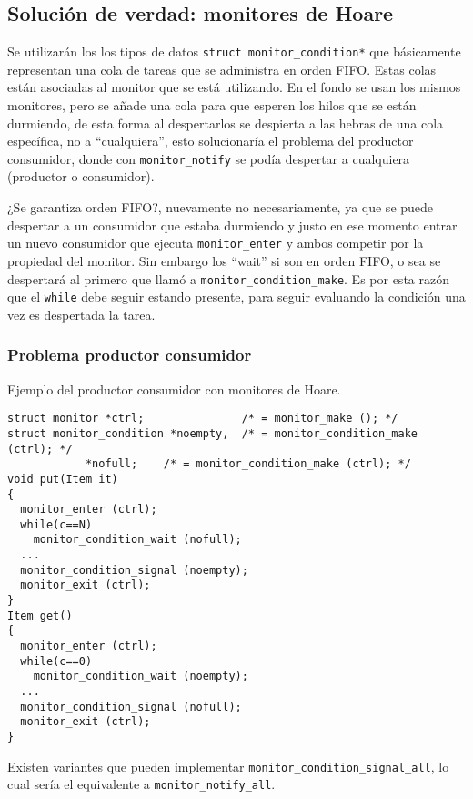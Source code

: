 \subsection{Solución de verdad: monitores de Hoare}

Se utilizarán los los tipos de datos \texttt{struct monitor\_condition*}
que básicamente representan una cola de tareas que se administra en orden FIFO.
Estas colas están asociadas al monitor que se está utilizando. En el fondo se
usan los mismos monitores, pero se añade una cola para que esperen los hilos que
se están durmiendo, de esta forma al despertarlos se despierta a las hebras de
una cola específica, no a ``cualquiera'', esto solucionaría el problema del
productor consumidor, donde con \texttt{monitor\_notify} se podía despertar a
cualquiera (productor o consumidor).

¿Se garantiza orden FIFO?, nuevamente no necesariamente, ya que se puede
despertar a un consumidor que estaba durmiendo y justo en ese momento entrar un
nuevo consumidor que ejecuta \texttt{monitor\_enter} y ambos competir por la
propiedad del monitor. Sin embargo los ``wait'' si son en orden FIFO, o sea se
despertará al primero que llamó a \texttt{monitor\_condition\_make}. Es por esta
razón que el \texttt{while} debe seguir estando presente, para seguir evaluando
la condición una vez es despertada la tarea.

\subsubsection{Problema productor consumidor}

Ejemplo del productor consumidor con monitores de Hoare.

\begin{lstlisting}
struct monitor *ctrl;               /* = monitor_make (); */
struct monitor_condition *noempty,  /* = monitor_condition_make (ctrl); */
			*nofull;    /* = monitor_condition_make (ctrl); */
void put(Item it)
{
  monitor_enter (ctrl);
  while(c==N)
    monitor_condition_wait (nofull);
  ...
  monitor_condition_signal (noempty);
  monitor_exit (ctrl);
}
Item get()
{
  monitor_enter (ctrl);
  while(c==0)
    monitor_condition_wait (noempty);
  ...
  monitor_condition_signal (nofull);
  monitor_exit (ctrl);
}
\end{lstlisting}

Existen variantes que pueden implementar
\texttt{monitor\_condition\_signal\_all}, lo cual sería el equivalente a
\texttt{monitor\_notify\_all}.

